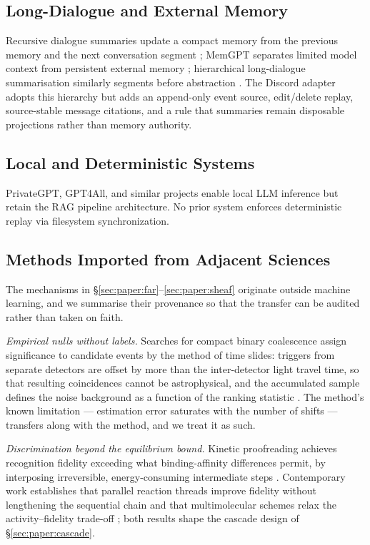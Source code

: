 \subsection{Long-Dialogue and External Memory}
Recursive dialogue summaries update a compact memory from the previous memory
and the next conversation segment \citep{wang2023recursive}; MemGPT separates
limited model context from persistent external memory
\citep{packer2023memgpt}; hierarchical long-dialogue summarisation similarly
segments before abstraction \citep{yin2024twostage}. The Discord adapter adopts
this hierarchy but adds an append-only event source, edit/delete replay,
source-stable message citations, and a rule that summaries remain disposable
projections rather than memory authority.

\subsection{Local and Deterministic Systems}
PrivateGPT, GPT4All, and similar projects enable local LLM inference but retain the RAG pipeline architecture. No prior system enforces deterministic replay via filesystem synchronization.

\subsection{Methods Imported from Adjacent Sciences}
\label{sec:paper:imported}
The mechanisms in \S\ref{sec:paper:far}--\ref{sec:paper:sheaf} originate outside machine learning, and we summarise their provenance so that the transfer can be audited rather than taken on faith.

\emph{Empirical nulls without labels.} Searches for compact binary coalescence assign significance to candidate events by the method of time slides: triggers from separate detectors are offset by more than the inter-detector light travel time, so that resulting coincidences cannot be astrophysical, and the accumulated sample defines the noise background as a function of the ranking statistic \citep{was2010timeslides,pycbclive2018}. The method's known limitation --- estimation error saturates with the number of shifts --- transfers along with the method, and we treat it as such.

\emph{Discrimination beyond the equilibrium bound.} Kinetic proofreading achieves recognition fidelity exceeding what binding-affinity differences permit, by interposing irreversible, energy-consuming intermediate steps \citep{hopfield1974kinetic,ninio1975kinetic}. Contemporary work establishes that parallel reaction threads improve fidelity without lengthening the sequential chain \citep{kirby2025parallel} and that multimolecular schemes relax the activity--fidelity trade-off \citep{multimolecular2026}; both results shape the cascade design of \S\ref{sec:paper:cascade}.

